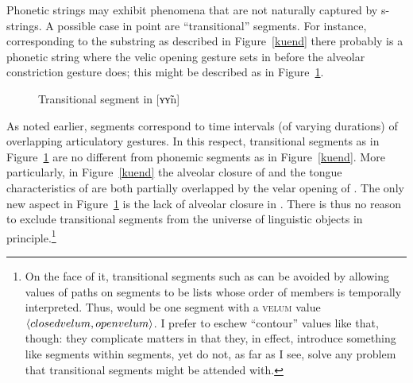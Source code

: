 \documentclass[output=paper]{langsci/langscibook}
\begin{document}
Phonetic strings may exhibit  phenomena that are not naturally
captured by s-strings. A possible case in point are ``transitional''
segments. For instance, corresponding to the substring \textipa{[Yn]} as
described in Figure~\ref{kuend} there probably is a phonetic string where
the velic opening gesture sets in before the alveolar constriction gesture
does; this might be described as in Figure~\ref{yyn}.
\begin{figure}[ht]
\caption{\label{yyn} Transitional segment in {[ʏʏ̃n]}} %
\end{figure}


As noted earlier, segments correspond to time intervals (of varying
durations) of overlapping articulatory gestures.  In this respect,
transitional segments as in Figure~\ref{yyn} are no different from phonemic
segments as in Figure~\ref{kuend}. More particularly, in Figure~\ref{kuend} the
alveolar closure of \textipa{[nd]} and the tongue characteristics of \textipa{[kYn]} are both partially overlapped by the velar opening of \textipa{[n]}.
The only new aspect in Figure~\ref{yyn} is the lack of alveolar closure in
\textipa{[\~Y]}. There is thus no reason to exclude transitional
segments from the universe of linguistic objects in principle.\footnote{%
	On the face of it, transitional segments such as
  {\textipa{[\~Y]}} can be avoided by allowing values of paths
  on segments to be lists whose order of members is temporally interpreted.
  Thus, \textipa{[Y\~Y]} would be one segment with a \textsc{velum}
  value $\left\langle closedvelum, openvelum\/ \right\rangle$. I prefer to
  eschew ``contour'' values like that, though: they complicate matters in
  that they, in effect, introduce something like segments within segments,
  yet do not, as far as I see, solve any problem that transitional segments
  might be attended with.%
}
\end{document}
